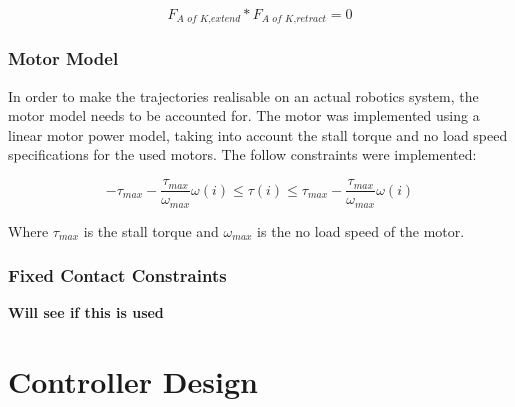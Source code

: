         \begin{equation}
            F_{\textit{A of K,extend}}*F_{\textit{A of K,retract}} = 0
        \end{equation}
        
        \subsubsection{Motor Model}
        In order to make the trajectories realisable on an actual robotics system, the motor model needs to be accounted for. The motor was implemented using a linear motor power model, taking into account the stall torque and no load speed specifications for the used motors. The follow constraints were implemented:
        
        \begin{equation}
            -\tau_{max} - \frac{\tau_{max}}{\omega_{max}}\omega(i) \leq \tau(i) \leq \tau_{max} - \frac{\tau_{max}}{\omega_{max}}\omega(i) 
        \end{equation}
        
        Where $\tau_{max}$ is the stall torque and $\omega_{max}$ is the no load speed of the motor.
        
        \subsubsection{Fixed Contact Constraints}
        \textbf{Will see if this is used}
        
    \section{Controller Design}